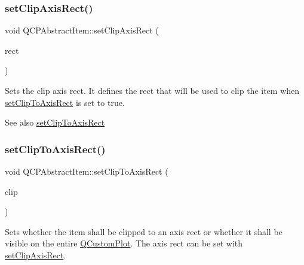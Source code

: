 \mbox{\label{class_q_c_p_abstract_item_a7dc75fcbcd10206fe0b75d757ea7a347}} 
\subsubsection{\texorpdfstring{set\+Clip\+Axis\+Rect()}{setClipAxisRect()}}
{\footnotesize\ttfamily void Q\+C\+P\+Abstract\+Item\+::set\+Clip\+Axis\+Rect (\begin{DoxyParamCaption}\item[{\mbox{\hyperlink{class_q_c_p_axis_rect}{Q\+C\+P\+Axis\+Rect}} $\ast$}]{rect }\end{DoxyParamCaption})}

Sets the clip axis rect. It defines the rect that will be used to clip the item when \mbox{\hyperlink{class_q_c_p_abstract_item_a39e05b9d4176b9accafc746d16ca6a06}{set\+Clip\+To\+Axis\+Rect}} is set to true.

\begin{DoxySeeAlso}{See also}
\mbox{\hyperlink{class_q_c_p_abstract_item_a39e05b9d4176b9accafc746d16ca6a06}{set\+Clip\+To\+Axis\+Rect}} 
\end{DoxySeeAlso}
\mbox{\label{class_q_c_p_abstract_item_a39e05b9d4176b9accafc746d16ca6a06}} 
\subsubsection{\texorpdfstring{set\+Clip\+To\+Axis\+Rect()}{setClipToAxisRect()}}
{\footnotesize\ttfamily void Q\+C\+P\+Abstract\+Item\+::set\+Clip\+To\+Axis\+Rect (\begin{DoxyParamCaption}\item[{bool}]{clip }\end{DoxyParamCaption})}

Sets whether the item shall be clipped to an axis rect or whether it shall be visible on the entire \mbox{\hyperlink{class_q_custom_plot}{Q\+Custom\+Plot}}. The axis rect can be set with \mbox{\hyperlink{class_q_c_p_abstract_item_a7dc75fcbcd10206fe0b75d757ea7a347}{set\+Clip\+Axis\+Rect}}.

